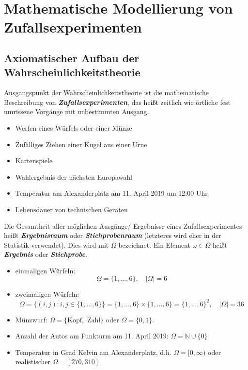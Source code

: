 \documentclass[a4paper, landscape,twocolumn,fontsize=9pt]{scrartcl}
\newcommand{\vip}[1]{\textit{\textbf{#1}}}
\begin{document}
\section{Mathematische Modellierung von Zufallsexperimenten}

\subsection{Axiomatischer Aufbau der Wahrscheinlichkeitstheorie}
Ausgangspunkt der Wahrscheinlichkeitstheorie ist die mathematische Beschreibung von \vip{Zufallsexperimenten}, das heißt zeitlich wie örtliche fest umrissene Vorgänge mit unbestimmten Ausgang.

\begin{example}{}{}
\begin{itemize}
	\item Werfen eines Würfels oder einer Münze
	\item Zufälliges Ziehen einer Kugel aus einer Urne
	\item Kartenspiele
	\item Wahlergebnis der nächsten Europawahl
	\item Temperatur am Alexanderplatz am 11. April 2019 um 12:00 Uhr
	\item Lebensdauer von technischen Geräten
\end{itemize}	
\end{example}

Die Gesamtheit aller möglichen Ausgänge/ Ergebnisse eines Zufallsexperimentes heißt \vip{Ergebnisraum} oder \vip{Stichprobenraum} (letzteres wird eher in der Statistik verwendet). Dies wird mit $\Omega$ bezeichnet. Ein Element $\omega \in \Omega$ heißt \vip{Ergebnis} oder \vip{Stichprobe}. 

\begin{example}{}{}
	\begin{itemize}
		\item einmaligen Würfeln: 
		\[
			\Omega = \{ 1,..., 6 \}, \quad |\Omega| = 6
		\]
		
		\item zweimaligen Würfeln:
		\[
			\Omega = \{ (i,j) : i,j \in \{ 1,...,6 \} \} = \{1,...,6\} \times \{1,...,6 \} = \{ 1,...,6 \}^2, \quad |\Omega| = 36
		\]
		
		\item Münzwurf: $\Omega = \{ \text{Kopf}, \text{ Zahl}\}$ oder $\Omega = \{ 0,1 \}$.
		\item Anzahl der Autos am Funkturm am 11. April 2019: $\Omega = \mathbb N \cup \{ 0 \}$
		
		\item Temperatur in Grad Kelvin am Alexanderplatz, d.h. $\Omega = [0,\infty)$ oder realistischer $\Omega = [270, 310]$

	\end{itemize}	
\end{example}
\end{document}
